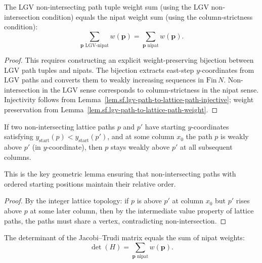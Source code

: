 \begin{lemma}
\label{lem.sf.jt-lgv-connection}
\leanhelper
\leanok
The LGV non-intersecting path tuple weight sum (using the LGV non-intersection condition)
equals the nipat weight sum (using the column-strictness condition):
\[
\sum_{\mathbf{p} \text{ LGV-nipat}} w(\mathbf{p})
= \sum_{\mathbf{p} \text{ nipat}} w(\mathbf{p}).
\]
\end{lemma}

\begin{proof}
This requires constructing an explicit weight-preserving bijection between
LGV path tuples and nipats.
The bijection extracts east-step
$y$-coordinates from LGV paths and converts them to weakly increasing
sequences in $\mathrm{Fin}\,N$.
Non-intersection in the LGV sense corresponds to column-strictness
in the nipat sense.
Injectivity follows from Lemma~\ref{lem.sf.lgv-path-to-lattice-path-injective};
weight preservation from Lemma~\ref{lem.sf.lgv-path-to-lattice-path-weight}.
\end{proof}

\begin{lemma}
\label{lem.sf.paths-above-stays-above}
\leanhelper
\leanok
If two non-intersecting lattice paths $p$ and $p'$ have starting
$y$-coordinates satisfying $y_{\mathrm{start}}(p) < y_{\mathrm{start}}(p')$,
and at some column $x_0$
the path $p$ is weakly above $p'$ (in $y$-coordinate), then $p$
stays weakly above $p'$ at all subsequent columns.

This is the key geometric lemma ensuring that non-intersecting
paths with ordered starting positions maintain their relative order.
\end{lemma}

\begin{proof}
By the integer lattice topology: if $p$ is above $p'$ at column $x_0$
but $p'$ rises above $p$ at some later column, then by the intermediate
value property of lattice paths, the paths must share a vertex,
contradicting non-intersection.
\end{proof}

\begin{lemma}
\label{lem.sf.jt-det-eq-nipat}
\leanhelper
\leanok
The determinant of the Jacobi--Trudi matrix equals the sum of nipat weights:
\[
\det(H) = \sum_{\mathbf{p} \text{ nipat}} w(\mathbf{p}).
\]
\end{lemma}

